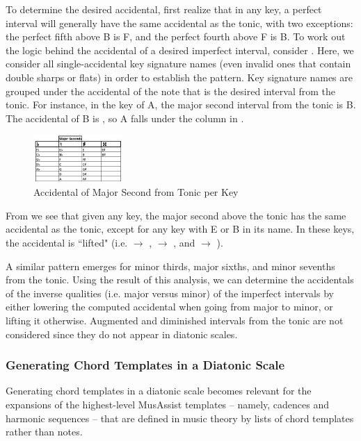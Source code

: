 \documentclass{article}
\begin{document}
To determine the desired accidental, first realize that in any key, a perfect interval will generally have the same accidental as the tonic, with two exceptions: the perfect fifth above B is F\musSharp, and the perfect fourth above F is B\musFlat. To work out the logic behind the accidental of a desired imperfect interval, consider . Here, we consider all single-accidental key signature names (even invalid ones that contain double sharps or flats) in order to establish the pattern. Key signature names are grouped under the accidental of the note that is the desired interval from the tonic. For instance, in the key of A\musFlat\;, the major second interval from the tonic is B\musFlat. The accidental of B\musFlat\; is \musFlat, so A\musFlat\; falls under the \musFlat\; column in .
\vspace{-2mm}
\begin{figure}[h!]
\centering
\includegraphics[width=0.3\textwidth]{images/maj_seconds}
\caption{Accidental of Major Second from Tonic per Key}
\label{maj_seconds}
\vspace{-2mm}
\end{figure}

From  we see that given any key, the major second above the tonic has the same accidental as the tonic, except for any key with E or B in its name. In these keys, the accidental is ``lifted"   (i.e. \musFlat $\rightarrow$ \musNatural, \musNatural $\rightarrow$ \musSharp, and \musSharp $\rightarrow$ \musDoubleSharp).

A similar pattern emerges for minor thirds, major sixths, and minor sevenths from the tonic. Using the result of this analysis, we can determine the accidentals of the inverse qualities (i.e. major versus minor) of the imperfect intervals by either lowering the computed accidental when going from major to minor, or lifting it otherwise. Augmented and diminished intervals from the tonic are not considered since they do not appear in diatonic scales.

\subsubsection{Generating Chord Templates in a Diatonic Scale}
\label{sec:chord_generate}
Generating chord templates in a diatonic scale becomes relevant for the expansions of the highest-level MusAssist templates – namely, cadences and harmonic sequences – that are defined in music theory by lists of chord templates rather than notes. 
\end{document}
